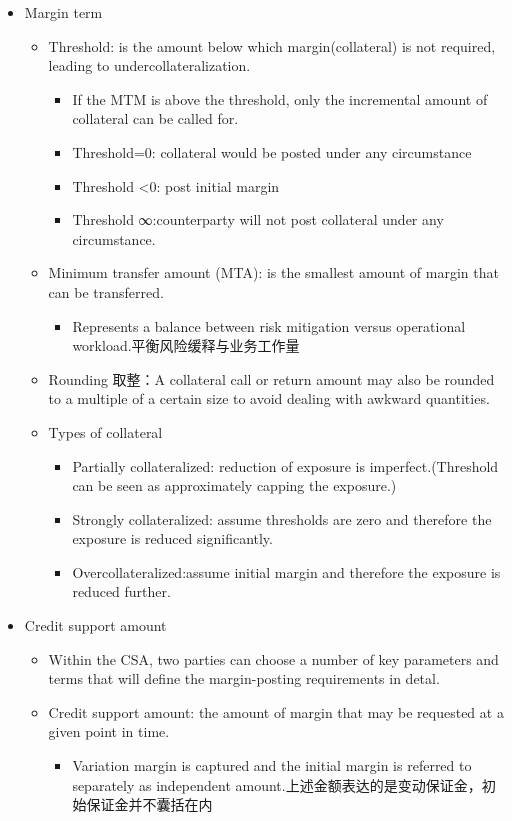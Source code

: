 \begin{itemize}
\item Margin term
\begin{itemize}
    \item Threshold: is the amount below which margin(collateral) is not required, leading to undercollateralization.
    \begin{itemize}
    \item If the MTM is above the threshold, only the incremental amount of collateral can be called for.
    \item Threshold=0: collateral would be posted under any circumstance
    \item Threshold <0: post initial margin
    \item Threshold ∞:counterparty will not post collateral under any circumstance.
    \end{itemize}
    \item Minimum transfer amount (MTA): is the smallest amount of margin that can be transferred.
    \begin{itemize}
    \item Represents a balance between risk mitigation versus operational workload.平衡风险缓释与业务工作量
      \end{itemize}
    \item Rounding 取整：A collateral call or return amount may also be rounded to a multiple of a certain size to avoid dealing with awkward quantities.
  
 \item Types of collateral
 \begin{itemize}
  \item Partially collateralized: reduction of exposure is imperfect.(Threshold can be seen as approximately capping the exposure.)
  \item Strongly collateralized: assume thresholds are zero and therefore the exposure is reduced significantly.
  \item Overcollateralized:assume initial margin and therefore the exposure is reduced further.
 \end{itemize}



\end{itemize}
\item Credit support amount
\begin{itemize}
\item Within the CSA, two parties can choose a number of key
parameters and terms that will define the margin-posting
requirements in detal.
 \item Credit support amount: the amount of margin that may be requested at a given point in time.
 \begin{itemize}
 \item Variation margin is captured and the initial margin is referred to separately as independent amount.上述金额表达的是变动保证金，初始保证金并不囊括在内
 \end{itemize}
\end{itemize}


\end{itemize}
